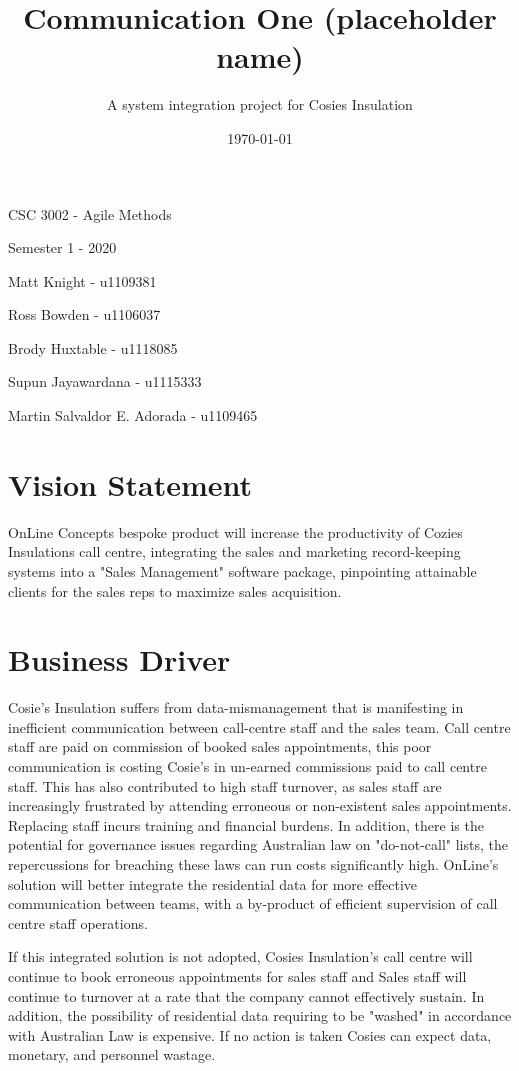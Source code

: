 \documentclass[11pt]{article} %
\title{Communication One (placeholder name)}
\author{A system integration project for Cosies Insulation}
\date{\today}
\begin{document}
\maketitle
\begin{center}
CSC 3002 - Agile Methods

Semester 1 - 2020

Matt Knight - u1109381

Ross Bowden - u1106037

Brody Huxtable - u1118085

Supun Jayawardana - u1115333

Martin Salvaldor E. Adorada - u1109465
\end{center}
\newpage

\tableofcontents       
\newpage


\section{Vision Statement}
\begin{center}
OnLine Concepts bespoke product will increase the productivity of Cozies Insulations call centre, integrating the sales and marketing record-keeping systems into a "Sales Management"
software package, pinpointing attainable clients for the sales reps to maximize sales acquisition.
\end{center}

\section{Business Driver}
\begin{flushleft}
Cosie's Insulation suffers from data-mismanagement that is manifesting in inefficient communication between call-centre staff and the sales team. Call centre staff are paid on commission of booked sales appointments, this poor communication is costing Cosie's in un-earned commissions paid to call centre staff. This has also contributed to high staff turnover, as sales staff are increasingly frustrated by attending erroneous or non-existent sales appointments. Replacing staff incurs training and financial burdens. In addition, there is the potential for governance issues regarding Australian law on "do-not-call" lists, the repercussions for breaching these laws can run costs significantly high. OnLine's solution will better integrate the residential data for more effective communication between teams, with a by-product of efficient supervision of call centre staff operations.

If this integrated solution is not adopted, Cosies Insulation's call centre will continue to book erroneous appointments for sales staff and Sales staff will continue to turnover at a rate that the company cannot effectively sustain. In addition, the possibility of residential data requiring to be "washed" in accordance with Australian Law is expensive. If no action is taken Cosies can expect data, monetary, and personnel wastage.

\end{flushleft}
\end{document}
